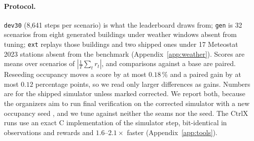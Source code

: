 \documentclass{article}
\newcommand{\cn}[1]{\texttt{#1}}
\begin{document}
\paragraph{Protocol.} \cn{dev30} (8{,}641 steps per scenario) is what the leaderboard draws
from; \cn{gen} is 32 scenarios from eight generated buildings under weather windows absent from
tuning; \cn{ext} replays those buildings and two shipped ones under 17 Meteostat 2023 stations
absent from the benchmark (Appendix~\ref{app:weather}). Scores are means over scenarios of
$|\tfrac1T\sum_t r_t|$, and comparisons against a base are paired. Reseeding occupancy moves a
score by at most $0.18\,\%$ and a paired gain by at most $0.12$ percentage points, so we read
only larger differences as gains. Numbers are for the shipped simulator unless marked
corrected. We report both, because the organizers aim to run final verification on the
corrected simulator \citep{rai2026verification,stncsn2026pr2,stncsn2026pr3} with a new occupancy
seed \citep{rai2026seed}, and we tune against neither the seams nor the seed. The CtrlX runs use
an exact C implementation of the simulator step, bit-identical in observations and rewards and
$1.6$--$2.1\times$ faster (Appendix~\ref{app:tools}).
\end{document}
